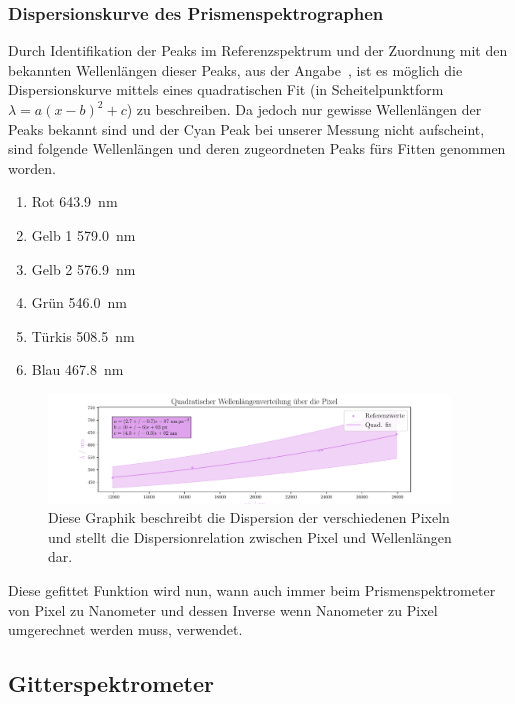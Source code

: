 \documentclass[12pt,english,ngerman]{scrartcl}
\begin{document}
\subsubsection{Dispersionskurve des Prismenspektrographen}\label{sec:DispersionPrism}


Durch Identifikation der Peaks im Referenzspektrum und der Zuordnung mit den
bekannten Wellenlängen dieser Peaks, aus der Angabe~\cite{}, ist es möglich die
Dispersionskurve mittels eines quadratischen Fit (in Scheitelpunktform $\lambda
	= a (x-b)^2 + c$) zu beschreiben. Da jedoch nur gewisse Wellenlängen der Peaks
bekannt sind und der Cyan Peak bei unserer Messung nicht aufscheint, sind
folgende Wellenlängen und deren zugeordneten Peaks fürs Fitten genommen worden.

\begin{enumerate}
	\item Rot \SI{643.9}{\nano\meter}
	\item Gelb 1 \SI{579.0}{\nano\meter}
	\item Gelb 2 \SI{576.9}{\nano\meter}
	\item Grün \SI{546.0}{\nano\meter}
	\item Türkis \SI{508.5}{\nano\meter}
	\item Blau \SI{467.8}{\nano\meter}
\end{enumerate}

\begin{figure}[H]
	\begin{center}
		\includegraphics[width=0.95\textwidth]{figures/mappingPxToWaveLength.pdf}
	\end{center}
	\caption{Diese Graphik beschreibt die Dispersion der verschiedenen Pixeln
		und stellt die Dispersionrelation zwischen Pixel und Wellenlängen dar.
	}\label{fig:dispersionkurve}
\end{figure}

Diese gefittet Funktion wird nun, wann auch immer beim Prismenspektrometer von
Pixel zu Nanometer und dessen Inverse wenn Nanometer zu Pixel umgerechnet
werden muss, verwendet.

\subsection{Gitterspektrometer}
\end{document}
